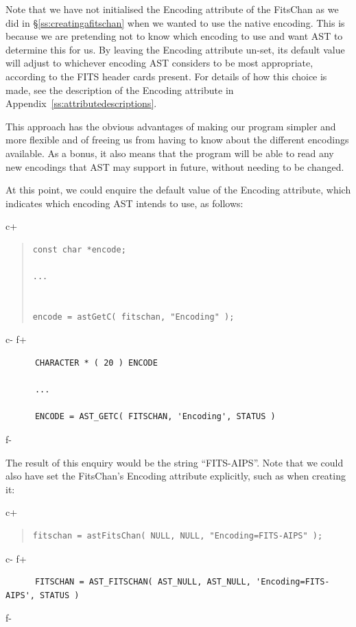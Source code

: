 \documentclass[twoside,11pt]{article}
\newcommand{\appref}[1]{Appendix~\ref{#1}}
\newcommand{\secref}[1]{\S\ref{#1}}
\newcommand{\appref}[1]{\ref{#1}}
\newcommand{\secref}[1]{\ref{#1}}
\begin{document}
Note that we have not initialised the Encoding attribute of the
FitsChan as we did in \secref{ss:creatingafitschan} when we wanted to
use the native encoding. This is because we are pretending not to know
which encoding to use and want AST to determine this for us. By
leaving the Encoding attribute un-set, its default value will adjust
to whichever encoding AST considers to be most appropriate, according
to the FITS header cards present. For details of how this choice is
made, see the description of the Encoding attribute in
\appref{ss:attributedescriptions}.

This approach has the obvious advantages of making our program simpler
and more flexible and of freeing us from having to know about the
different encodings available. As a bonus, it also means that the
program will be able to read any new encodings that AST may support in
future, without needing to be changed.

At this point, we could enquire the default value of the Encoding
attribute, which indicates which encoding AST intends to use, as
follows:

c+
\begin{quote}
\small
\begin{verbatim}
const char *encode;

...


encode = astGetC( fitschan, "Encoding" );
\end{verbatim}
\normalsize
\end{quote}
c-
f+
\small
\begin{verbatim}
      CHARACTER * ( 20 ) ENCODE

      ...

      ENCODE = AST_GETC( FITSCHAN, 'Encoding', STATUS )
\end{verbatim}
\normalsize
f-

The result of this enquiry would be the string ``FITS-AIPS''.  Note
that we could also have set the FitsChan's Encoding attribute
explicitly, such as when creating it:

c+
\begin{quote}
\small
\begin{verbatim}
fitschan = astFitsChan( NULL, NULL, "Encoding=FITS-AIPS" );
\end{verbatim}
\normalsize
\end{quote}
c-
f+
\small
\begin{verbatim}
      FITSCHAN = AST_FITSCHAN( AST_NULL, AST_NULL, 'Encoding=FITS-AIPS', STATUS )
\end{verbatim}
\normalsize
f-
\end{document}
